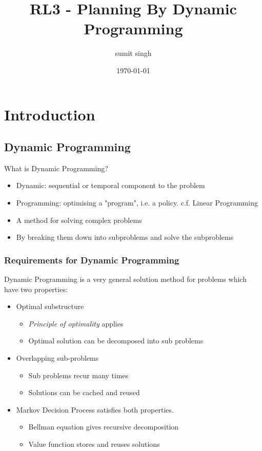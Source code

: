 \documentclass[varwidth]{article}
\title{RL3 - Planning By Dynamic Programming}
\author{sumit singh}
\date{\today}
\begin{document}
\maketitle

\section{Introduction}
\subsection{Dynamic Programming}
What is Dynamic Programming? \\
\begin{itemize}
    \item Dynamic: sequential or temporal component to the problem 
    \item Programming: optimising a "program", i.e. a policy. c.f. Linear Programming 
    \item A method for solving complex problems
    \item By breaking them down into subproblems and solve the subproblems
\end{itemize}
\subsubsection{Requirements for Dynamic Programming}
Dynamic Programming is a very general solution method for problems which have two properties:
\begin{itemize}
    \item Optimal substructure
    \begin{itemize}
        \item \textit{Principle of optimality} applies
        \item Optimal solution can be decomposed into sub problems
    \end{itemize}
    \item Overlapping sub-problems
    \begin{itemize}
        \item Sub problems recur many times
        \item Solutions can be cached and reused
    \end{itemize}
    \item Markov Decision Process satisfies both properties.
    \begin{itemize}
        \item Bellman equation gives recursive decomposition
        \item Value function stores and reuses solutions
    \end{itemize}
\end{itemize}
\end{document}
